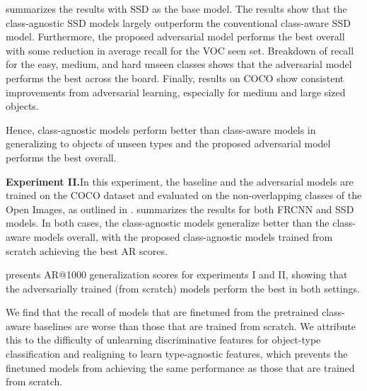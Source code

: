 \documentclass[10pt,twocolumn,letterpaper]{article}
\begin{document}
 summarizes the results with SSD as the base model. The results show that the class-agnostic SSD models largely outperform the conventional class-aware SSD model. Furthermore, the proposed adversarial model performs the best overall with some reduction in average recall for the VOC seen set. Breakdown of recall for the easy, medium, and hard unseen classes shows that the adversarial model performs the best across the board. Finally, results on COCO show consistent improvements from adversarial learning, especially for medium and large sized objects.

Hence, class-agnostic models perform better than class-aware models in generalizing to objects of unseen types and the proposed adversarial model performs the best overall.

\vspace{3pt}
\noindent\textbf{Experiment II.}\quad In this experiment, the baseline and the adversarial models are trained on the COCO dataset and evaluated on the non-overlapping classes of the Open Images, as outlined in .  summarizes the results for both FRCNN and SSD models. In both cases, the class-agnostic models generalize better than the class-aware models overall, with the proposed class-agnostic models trained from scratch achieving the best AR scores.

\vspace{2pt}
 presents AR@1000 generalization scores for experiments I and II, showing that the adversarially trained (from scratch) models perform the best in both settings.

We find that the recall of models that are finetuned from the pretrained class-aware baselines are worse than those that are trained from scratch. We attribute this to the difficulty of unlearning discriminative features for object-type classification and realigning to learn type-agnostic features, which prevents the finetuned models from achieving the same performance as those that are trained from scratch.
\end{document}
